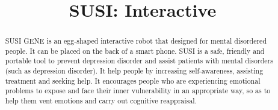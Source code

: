 \documentclass[manuscript,screen]{acmart}
\begin{document}
\title{SUSI: Interactive}










\renewcommand{\shortauthors}{Zhang and Tong, et al.}

\begin{abstract}
  SUSI GENE is an egg-shaped interactive robot that designed for mental disordered people. It can be placed on the back of  a smart phone.
  SUSI is a safe, friendly and portable tool to prevent depression disorder and assist patients with mental disorders (such as depression disorder). It help people by increasing self-awareness, assisting treatment and seeking help. 
  It encourages people who are experiencing emotional problems to expose and face their inner vulnerability in an appropriate way, so as to help them vent emotions and carry out cognitive reappraisal.
\end{abstract}
\end{document}
